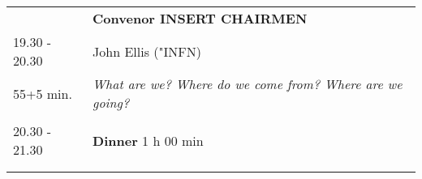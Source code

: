 \begin{longtable}{p{3cm}p{13cm}}
&\hfill {\bf Convenor INSERT CHAIRMEN }\\ 
19.30 - 20.30 & John Ellis ("INFN)\\ 
55+5 min. & {\it What are we? Where do we come from? Where are we going?}\\ 
 & \\ 
20.30 - 21.30 & {\bf Dinner} \hfill 1 h 00 min \\ 
 & \\ 
 & \\ 
\end{longtable}

